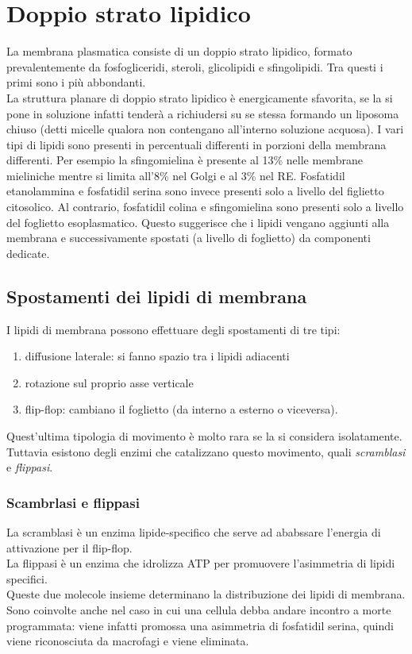 \section{Doppio strato lipidico}
    La membrana plasmatica consiste di un doppio strato lipidico, formato prevalentemente da fosfogliceridi, steroli, glicolipidi e sfingolipidi. Tra questi i primi sono i più abbondanti.\\
    La struttura planare di doppio strato lipidico è energicamente sfavorita, se la si pone in soluzione infatti tenderà a richiudersi su se stessa formando un liposoma chiuso (detti micelle qualora non contengano all'interno soluzione acquosa).
    \vspace{0.5cm}
    I vari tipi di lipidi sono presenti in percentuali differenti in porzioni della membrana differenti. Per esempio la sfingomielina è presente al 13\% nelle membrane mieliniche mentre si limita all'8\% nel Golgi e al 3\% nel RE.
    Fosfatidil etanolammina e fosfatidil serina sono invece presenti solo a livello del figlietto citosolico. 
    Al contrario, fosfatidil colina e sfingomielina sono presenti solo a livello del foglietto esoplasmatico.
    Questo suggerisce che i lipidi vengano aggiunti alla membrana e successivamente spostati (a livello di foglietto) da componenti dedicate.
    \subsection{Spostamenti dei lipidi di membrana}
        I lipidi di membrana possono effettuare degli spostamenti di tre tipi:
        \begin{enumerate}
            \item diffusione laterale: si fanno spazio tra i lipidi adiacenti
            \item rotazione sul proprio asse verticale
            \item flip-flop: cambiano il foglietto (da interno a esterno o viceversa).
        \end{enumerate}
        Quest'ultima tipologia di movimento è molto rara se la si considera isolatamente. Tuttavia esistono degli enzimi che catalizzano questo movimento, quali \textit{scramblasi} e \textit{flippasi}.
        \subsubsection{Scambrlasi e flippasi}
            La scramblasi è un enzima lipide-specifico che serve ad ababssare l'energia di attivazione per il flip-flop. \\
            La flippasi è un enzima che idrolizza ATP per promuovere l'asimmetria di lipidi specifici. \\
            Queste due molecole insieme determinano la distribuzione dei lipidi di membrana. Sono coinvolte anche nel caso in cui una cellula debba andare incontro a morte programmata: viene infatti promossa una asimmetria di fosfatidil serina, quindi viene riconosciuta da macrofagi e viene eliminata.
        
